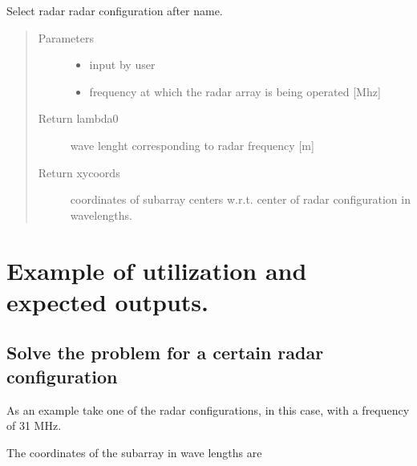 \documentclass[letterpaper,12pt,english]{sphinxmanual}
\begin{document}
\begin{fulllineitems}
\label{\detokenize{radarconf:radarconf.radar_conf}}
Select radar radar configuration after name.
\begin{quote}\begin{description}
\item[{Parameters}] \leavevmode\begin{itemize}
\item {} 
 \textendash{} input by user

\item {} 
 \textendash{} frequency at which the radar array is being operated {[}Mhz{]}

\end{itemize}

\item[{Return lambda0}] \leavevmode
wave lenght corresponding to radar frequency {[}m{]}

\item[{Return xycoords}] \leavevmode
coordinates of subarray centers w.r.t. center of radar configuration in wavelengths.

\end{description}\end{quote}

\end{fulllineitems}



\chapter{Example of utilization and expected outputs.}
\label{\detokenize{test_example:example-of-utilization-and-expected-outputs}}\label{\detokenize{test_example::doc}}

\section{Solve the problem for a certain radar configuration}
\label{\detokenize{test_example:solve-the-problem-for-a-certain-radar-configuration}}
As an example take one of the radar configurations,  in this case, with a frequency of 31 MHz.

The coordinates of the subarray in wave lengths are
\end{document}
